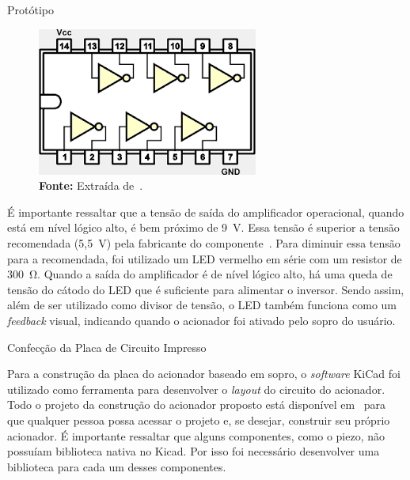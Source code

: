 \begin{chapter}{Protótipo}
\begin{figure}[!h]
	\centering
	\begin{minipage}[c]{\textwidth}
	\centering
	\includegraphics[width=0.45\linewidth]{fig/sn7404}
	\caption{Circuito interno do componente SN7404.}
	\vspace{-1cm}
	\caption*{\textbf{Fonte: }Extraída de~\cite{sn7404im}.}
	\label{fig:sn7404}
	\end{minipage}
\end{figure} 

É importante ressaltar que a tensão de saída do amplificador operacional, quando
está em nível lógico alto, é bem próximo de 9~V. Essa tensão é superior a tensão
recomendada (5,5~V) pela fabricante do componente~\cite{7404}.  Para diminuir
essa tensão para a recomendada, foi utilizado um LED vermelho em série com um
resistor de 300~\si{\ohm}. Quando a saída do amplificador é de nível lógico
alto, há uma queda de tensão do cátodo do LED que é suficiente para alimentar o
inversor. Sendo assim, além de ser utilizado como divisor de tensão, o LED
também funciona como um \textit{feedback} visual, indicando quando o acionador
foi ativado pelo sopro do usuário.  


\begin{section}{Confecção da Placa de Circuito Impresso}

Para a construção da placa do acionador baseado em sopro, o \textit{software}
KiCad foi utilizado como ferramenta para desenvolver o \textit{layout} do
circuito do acionador. Todo o projeto da construção do acionador proposto está
disponível em~\cite{ErickGit} para que qualquer pessoa possa acessar o projeto
e, se desejar, construir seu próprio acionador. É importante ressaltar que
alguns componentes, como o piezo, não possuíam biblioteca nativa no Kicad. Por
isso foi necessário desenvolver uma biblioteca para cada um desses componentes.


\end{section}
\end{chapter}
